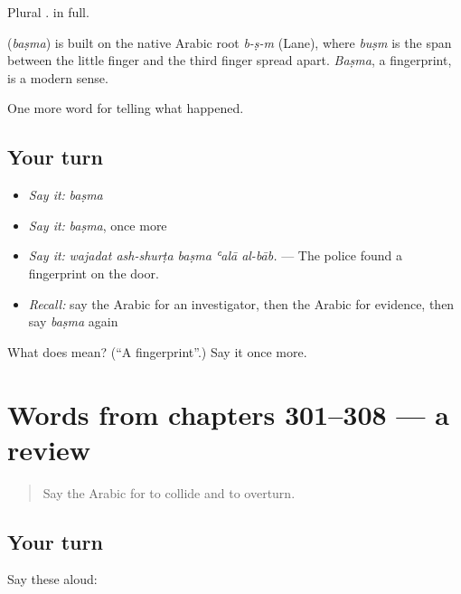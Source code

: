 Plural .   in full.

\begin{cousinweb}
\textbf{} (\emph{baṣma}) is built on the native Arabic root \emph{b-ṣ-m} (Lane), where \emph{buṣm} is the span between the little finger and the third finger spread apart. \emph{Baṣma}, a fingerprint, is a modern sense.
\end{cousinweb}

\begin{grammarlens}[title={What you've built}]
One more word for telling what happened.
\end{grammarlens}

\subsection*{Your turn}
\begin{itemize}
\raggedright
  \item \emph{Say it:} \emph{baṣma}
  \item \emph{Say it:} \emph{baṣma}, once more
  \item \emph{Say it:} \emph{wajadat ash-shurṭa baṣma ʿalā al-bāb.} — The police found a fingerprint on the door.
  \item \emph{Recall:} say the Arabic for an investigator, then the Arabic for evidence, then say \emph{baṣma} again
\end{itemize}

\begin{tcolorbox}[breakable,colback=teal!4,colframe=teal!35!black,title={Before you move on}]
What does  mean? (\textquotedblleft{}A fingerprint\textquotedblright{}.) Say it once more.
\end{tcolorbox}
\section[(dialogue)]{Words from chapters 301–308 — a review}

\label{lesson:AR-R308-review-301-308}



\begin{quote}
Say the Arabic for to collide and to overturn.
\end{quote}

\subsection*{Your turn}
Say these aloud:

